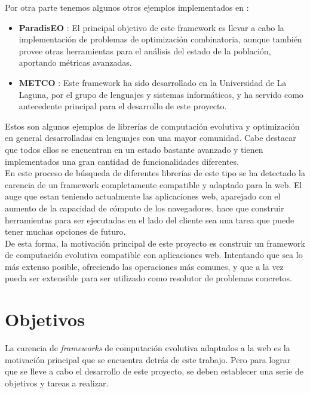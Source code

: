 Por otra parte tenemos algunos otros ejemplos implementados en \CC:

\begin{itemize}
    \item \textbf{ParadisEO} \cite{cahon2004paradiseo}: El principal objetivo de este framework es llevar a cabo la implementación de problemas de optimización combinatoria, aunque también provee otras herramientas para el análisis del estado de la población, aportando métricas avanzadas.
    \item \textbf{METCO} \cite{leon2009metco}: Este framework ha sido desarrollado en la Universidad de La Laguna, por el grupo de lenguajes y sistemas informáticos, y ha servido como antecedente principal para el desarrollo de este proyecto.
\end{itemize}

Estos son algunos ejemplos de librerías de computación evolutiva y optimización en general desarrolladas en lenguajes con una mayor comunidad. Cabe destacar que todos ellos se encuentran en un estado bastante avanzado y tienen implementados una gran cantidad de funcionalidades diferentes. \\

En este proceso de búsqueda de diferentes librerías de este tipo se ha detectado la carencia de un framework completamente compatible y adaptado para la web. El auge que estan teniendo actualmente las aplicaciones web, aparejado con el aumento de la capacidad de cómputo de los navegadores, hace que construir herramientas para ser ejecutadas en el lado del cliente sea una tarea que puede tener muchas opciones de futuro. \\

De esta forma, la motivación principal de este proyecto es construir un framework de computación evolutiva compatible con aplicaciones web. Intentando que sea lo más extenso posible, ofreciendo las operaciones más comunes, y que a la vez pueda ser extensible para ser utilizado como resolutor de problemas concretos.

\section{Objetivos}
\label{1:sec:5}

La carencia de \textit{frameworks} de computación evolutiva adaptados a la web es la motivación principal que se encuentra detrás de este trabajo. Pero para lograr que se lleve a cabo el desarrollo de este proyecto, se deben establecer una serie de objetivos y tareas a realizar. \\

